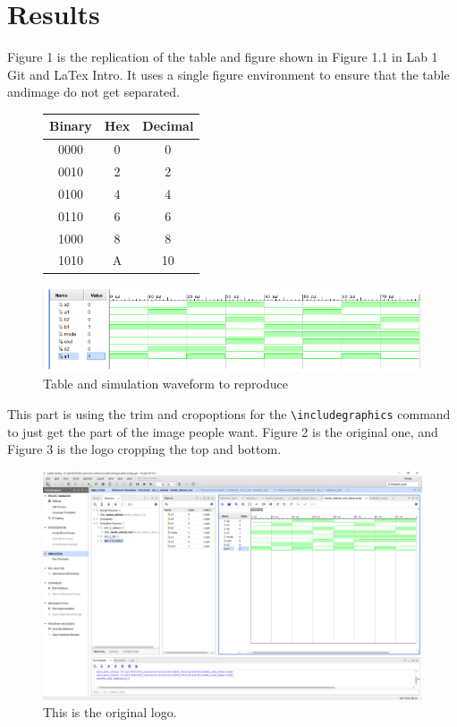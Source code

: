 \documentclass[11pt]{article}
\begin{document}
	
	
\section*{Results}

	Figure 1 is the replication of the table and figure shown in Figure 1.1 in Lab 1 Git and LaTex Intro. It  uses a single figure environment to ensure that the table andimage do not get separated.\\ 
	\begin{figure}[ht]\centering
		\begin{tabular}{c|c|c}
			\toprule
			Binary & Hex & Decimal \\
			\midrule
			0000 & 0 & 0 \\
			0010 & 2 & 2 \\
			0100 & 4 & 4 \\
			0110 & 6 & 6 \\
			1000 & 8 & 8 \\
			1010 & A & 10 \\
			\bottomrule
		\end{tabular}\medskip
		
		\centering
		\includegraphics[width=1.0\linewidth]{Lab1F1}
		\caption{Table and simulation waveform to reproduce}
		\label{fig:lab1table}
	\end{figure}
	
	This part is using the trim and cropoptions for the \verb|\includegraphics| command to just get the part of the image people want. Figure 2 is the original one, and Figure 3 is the logo cropping the top and bottom.\\
	\begin{figure}[ht]\centering
		\includegraphics[width=1.0\textwidth]{Lab1Table}
		\caption{This is the original logo.}
		\label{fig:Lab1Table}
	\end{figure}
	
\end{document}
